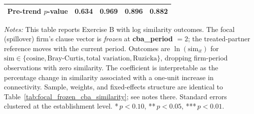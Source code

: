 \begin{table}[H]
\begin{tabular}{lcccc}
Pre-trend $p$-value & 0.634 & 0.969 & 0.896 & 0.882 \\
\hline\hline
\end{tabular}
\begin{minipage}{\linewidth}
\smallskip
\scriptsize\textit{Notes:} This table reports Exercise B with log similarity outcomes. The focal (spillover) firm's clause vector is \emph{frozen} at \textbf{cba\_period $= 2$}; the treated-partner reference moves with the current period. Outcomes are $\ln(\text{sim}_{it})$ for $\text{sim} \in \{\text{cosine}, \text{Bray-Curtis}, \text{total variation}, \text{Ruzicka}\}$, dropping firm-period observations with zero similarity. The coefficient is interpretable as the percentage change in similarity associated with a one-unit increase in connectivity. Sample, weights, and fixed-effects structure are identical to Table~\ref{tab:focal_frozen_cba_similarity}; see notes there. Standard errors clustered at the establishment level. *\,$p<0.10$, **\,$p<0.05$, ***\,$p<0.01$.
\end{minipage}
\end{table}
